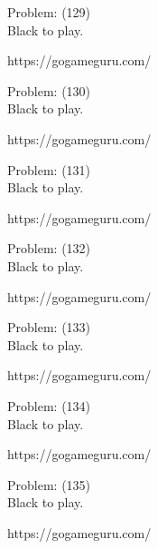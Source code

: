\documentclass[11pt]{article}
\begin{document}
\begin{minipage}[t]{0.5\textwidth}
  {\centering
  
Problem: (129)\\
Black to play.

https://gogameguru.com/\\
  }
\end{minipage}
\begin{minipage}[t]{0.5\textwidth}
  {\centering
  
Problem: (130)\\
Black to play.

https://gogameguru.com/\\
  }
\end{minipage}
\begin{minipage}[t]{0.5\textwidth}
  {\centering
  
Problem: (131)\\
Black to play.

https://gogameguru.com/\\
  }
\end{minipage}
\begin{minipage}[t]{0.5\textwidth}
  {\centering
  
Problem: (132)\\
Black to play.

https://gogameguru.com/\\
  }
\end{minipage}
\begin{minipage}[t]{0.5\textwidth}
  {\centering
  
Problem: (133)\\
Black to play.

https://gogameguru.com/\\
  }
\end{minipage}
\begin{minipage}[t]{0.5\textwidth}
  {\centering
  
Problem: (134)\\
Black to play.

https://gogameguru.com/\\
  }
\end{minipage}
\begin{minipage}[t]{0.5\textwidth}
  {\centering
  
Problem: (135)\\
Black to play.

https://gogameguru.com/\\
  }
\end{minipage}
\end{document}

